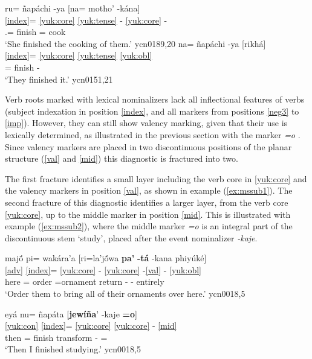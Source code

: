 \documentclass[output=paper]{langscibook}
\begin{document}
\ea \label{ex:mssub0}
    \glll  ru= ñapáchi -ya [na= motho' -kána] \\
\ref{index}= \ref{yuk:core} \ref{yuk:tense} - \ref{yuk:core} -\\
         \Tsg{}.\F{}= finish \Pst{} \Tpl{}= cook \Nmlz{} \\
    \glt `She finished the cooking of them.' \hfill ycn0189,20
 \z
\ea \label{ex:mssuba}
    \glll na= ñapáchi -ya [rikhá] \\
\ref{index}= \ref{yuk:core} \ref{yuk:tense} \ref{yuk:obl}  \\
    \Tpl{}= finish -\Pst{} \Tsg{} \\
    \glt `They finished it.' \hfill ycn0151,21
 \z


Verb roots marked with lexical nominalizers lack all inflectional features of verbs (subject indexation in position \ref{index}, and all markers from positions \ref{neg3} to \ref{imp}). However, they can still show valency marking, given that their use is lexically determined, as illustrated in the previous section with the marker \textit{=o} \Mid{}. Since valency markers are placed in two discontinuous positions of the planar structure (\ref{val} and \ref{mid}) this diagnostic is fractured into two. 

The first fracture identifies a small layer including the verb core in \ref{yuk:core} and the valency markers in position \ref{val}, as shown in example (\ref{ex:mssub1}). The second fracture of this diagnostic identifies a larger layer, from the verb core \ref{yuk:core}, up to the middle marker in position \ref{mid}. This is illustrated with example (\ref{ex:mssub2}), where the middle marker \textit{=o} is an integral part of the discontinuous stem `study', placed after the event nominalizer \textit{-kaje}. 

\ea \label{ex:mssub1}
    \glll majṍ pi= wakára'a [ri=la'jṍwa \textbf{pa'} \textbf{-tá} -kana phiyúké] \\
        \ref{adv} \ref{index}= \ref{yuk:core} - \ref{yuk:core} -\ref{val} - \ref{yuk:obl}\\
        here \Ssg{}= order \Tsg{}=ornament return -\Caus{}  -\Nmlz{} entirely\\
    \glt `Order them to bring all of their ornaments over here.' \hfill ycn0018,5
 \z
 
\ea \label{ex:mssub2}
    \glll eyá nu= ñapáta [\textbf{jewíña}' -kaje \textbf{=o}]  \\
         \ref{yuk:con} \ref{index}= \ref{yuk:core} \ref{yuk:core} - \ref{mid} \\
       then \Fsg{}= finish transform -\Nmlz{} =\Mid{}\\
    \glt `Then I finished studying.' \hfill ycn0018,5
 \z
\end{document}
